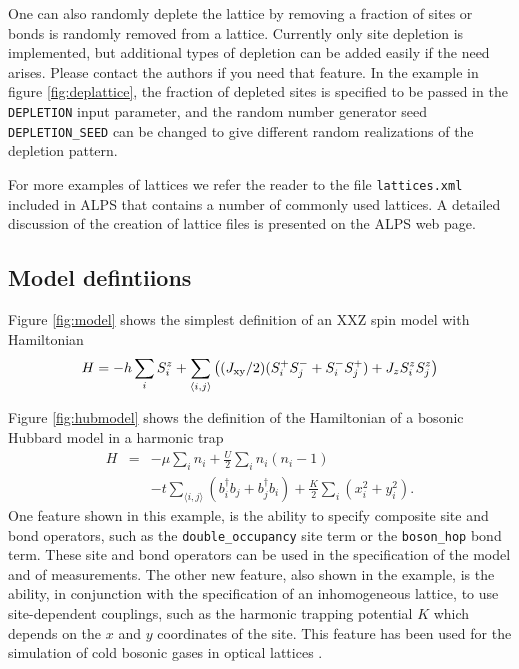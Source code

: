 \documentclass[12pt]{iopart}
\begin{document}
One can also randomly deplete the lattice by removing a fraction of sites or bonds is randomly removed from a lattice. Currently only site depletion is implemented, but additional types of depletion can be added easily if  the need arises. Please contact the authors if you need that feature. In the example in figure  \ref{fig:deplattice}, the fraction of depleted sites is specified to be passed in the {\tt DEPLETION} input parameter, and the random number generator seed {\tt DEPLETION\_SEED} can be changed to give different random realizations of the depletion pattern.

For more examples of lattices we refer the reader to the file {\tt lattices.xml} included in ALPS that contains a number of commonly used lattices. A detailed discussion of the creation of lattice files is presented on the ALPS web page.


\subsection{Model defintiions}

Figure \ref{fig:model} shows the simplest definition of an XXZ spin model with Hamiltonian
\begin{equation}
H=-h\sum_iS_i^z+\sum_{\langle i,j\rangle} \left((J_{\rm xy}/2)(S_i^+S_j^-+S_i^-S_j^+)+J_zS_i^zS_j^z\right)
\end{equation}

Figure \ref{fig:hubmodel} shows the definition of the Hamiltonian of a bosonic Hubbard model in a harmonic trap
 \begin{eqnarray}
 H&=&-\mu\sum_in_i+\frac{U}{2}\sum_in_i(n_i-1)   \label{eq:model} \\
    && -t \sum_{\langle
    i,j\rangle} \left(b_i^\dag b_j + b_j^\dag b_i\right) + \frac{K}{2}\sum_i(x_i^2+y_i^2). \nonumber
  \end{eqnarray}
One feature shown in this example, is the ability to specify composite site and bond operators, such as the {\tt double\_occupancy} site term or the {\tt boson\_hop} bond term. These site and bond operators can be used in the specification of the model and of measurements.
  The other new feature, also shown in the example, is the ability, in conjunction with the specification of an inhomogeneous lattice,  to use site-dependent couplings, such as the harmonic trapping potential $K$ which depends on the $x$ and $y$ coordinates of the site. This feature has been used for the simulation of cold bosonic gases in optical lattices \cite{Wessel2004}.
\end{document}
